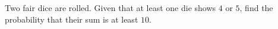 Two fair dice are rolled. Given that at least one die shows $4$ or $5$, find the probability that their sum is at least $10$.
